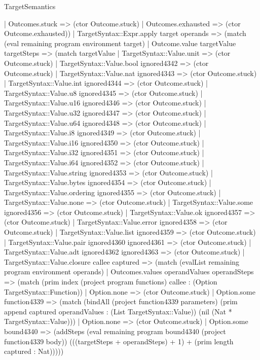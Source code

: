 \begin{lexlean}{TargetSemantics}
\begin{semanticmodule}
{        | Outcomes.stuck => (ctor Outcome.stuck)
        | Outcomes.exhausted => (ctor Outcome.exhausted))
      | TargetSyntax::Expr.apply target operands => (match (eval remaining program environment target)
        | Outcome.value targetValue targetSteps => (match targetValue
          | TargetSyntax::Value.unit => (ctor Outcome.stuck)
          | TargetSyntax::Value.bool ignored4342 => (ctor Outcome.stuck)
          | TargetSyntax::Value.nat ignored4343 => (ctor Outcome.stuck)
          | TargetSyntax::Value.int ignored4344 => (ctor Outcome.stuck)
          | TargetSyntax::Value.u8 ignored4345 => (ctor Outcome.stuck)
          | TargetSyntax::Value.u16 ignored4346 => (ctor Outcome.stuck)
          | TargetSyntax::Value.u32 ignored4347 => (ctor Outcome.stuck)
          | TargetSyntax::Value.u64 ignored4348 => (ctor Outcome.stuck)
          | TargetSyntax::Value.i8 ignored4349 => (ctor Outcome.stuck)
          | TargetSyntax::Value.i16 ignored4350 => (ctor Outcome.stuck)
          | TargetSyntax::Value.i32 ignored4351 => (ctor Outcome.stuck)
          | TargetSyntax::Value.i64 ignored4352 => (ctor Outcome.stuck)
          | TargetSyntax::Value.string ignored4353 => (ctor Outcome.stuck)
          | TargetSyntax::Value.bytes ignored4354 => (ctor Outcome.stuck)
          | TargetSyntax::Value.ordering ignored4355 => (ctor Outcome.stuck)
          | TargetSyntax::Value.none => (ctor Outcome.stuck)
          | TargetSyntax::Value.some ignored4356 => (ctor Outcome.stuck)
          | TargetSyntax::Value.ok ignored4357 => (ctor Outcome.stuck)
          | TargetSyntax::Value.error ignored4358 => (ctor Outcome.stuck)
          | TargetSyntax::Value.list ignored4359 => (ctor Outcome.stuck)
          | TargetSyntax::Value.pair ignored4360 ignored4361 => (ctor Outcome.stuck)
          | TargetSyntax::Value.adt ignored4362 ignored4363 => (ctor Outcome.stuck)
          | TargetSyntax::Value.closure callee captured => (match (evalList remaining program environment operands)
            | Outcomes.values operandValues operandSteps => (match (prim index (project program functions) callee : (Option TargetSyntax::Function))
              | Option.none => (ctor Outcome.stuck)
              | Option.some function4339 => (match (bindAll (project function4339 parameters) (prim append captured operandValues : (List TargetSyntax::Value)) (nil (Nat * TargetSyntax::Value)))
                | Option.none => (ctor Outcome.stuck)
                | Option.some bound4340 => (addSteps (eval remaining program bound4340 (project function4339 body)) (((targetSteps + operandSteps) + 1) + (prim length captured : Nat)))))
}
\end{semanticmodule}
\end{lexlean}
